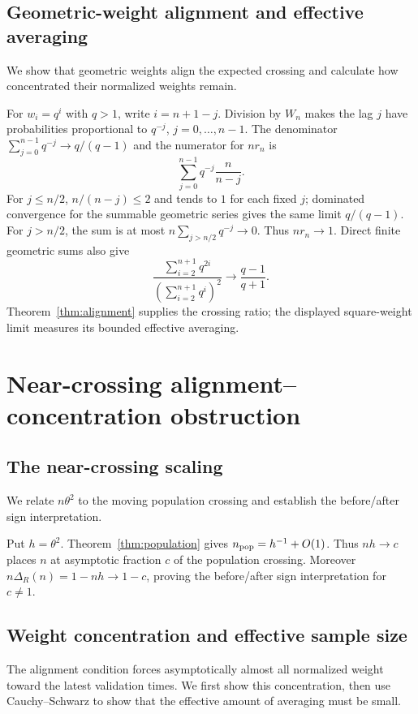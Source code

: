 \documentclass[11pt]{article}
\theoremstyle{definition}
\begin{document}
\subsection{Geometric-weight alignment and effective averaging}\label{app:geometric}
We show that geometric weights align the expected crossing and calculate how concentrated their normalized weights remain.

For $w_i=q^i$ with $q>1$, write $i=n+1-j$. Division by $W_n$ makes the lag $j$ have probabilities proportional to $q^{-j}$, $j=0,\ldots,n-1$. The denominator $\sum_{j=0}^{n-1}q^{-j}\to q/(q-1)$ and the numerator for $nr_n$ is
\[
\sum_{j=0}^{n-1}q^{-j}\frac{n}{n-j}.
\]
For $j\le n/2$, $n/(n-j)\le2$ and tends to $1$ for each fixed $j$; dominated convergence for the summable geometric series gives the same limit $q/(q-1)$. For $j>n/2$, the sum is at most $n\sum_{j>n/2}q^{-j}\to0$. Thus $nr_n\to1$. Direct finite geometric sums also give
\[
\frac{\sum_{i=2}^{n+1}q^{2i}}{(\sum_{i=2}^{n+1}q^i)^2}
\longrightarrow\frac{q-1}{q+1}.
\]
Theorem~\ref{thm:alignment} supplies the crossing ratio; the displayed square-weight limit measures its bounded effective averaging.

\section{Near-crossing alignment--concentration obstruction}

\subsection{The near-crossing scaling}\label{app:scaling}
We relate $n\theta^2$ to the moving population crossing and establish the before/after sign interpretation.

Put $h=\theta^2$. Theorem~\ref{thm:population} gives $n_{\rm pop}=h^{-1}+O(1)$. Thus $nh\to c$ places $n$ at asymptotic fraction $c$ of the population crossing. Moreover $n\Delta_R(n)=1-nh\to1-c$, proving the before/after sign interpretation for $c\ne1$.

\subsection{Weight concentration and effective sample size}\label{app:effective}
The alignment condition forces asymptotically almost all normalized weight toward the latest validation times. We first show this concentration, then use Cauchy--Schwarz to show that the effective amount of averaging must be small.
\end{document}
